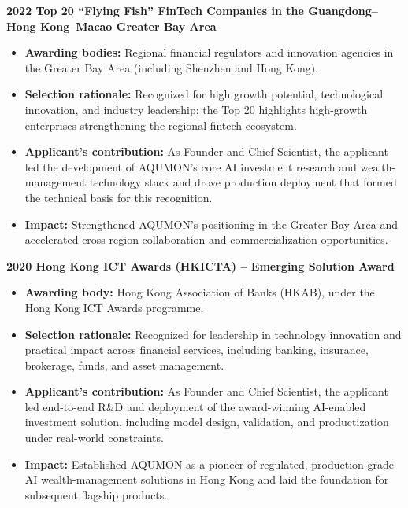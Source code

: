 \documentclass[11pt]{article}
\newenvironment{tightitemize}{%
  \begin{itemize}[leftmargin=*,nosep,topsep=2pt]
}{\end{itemize}}
\begin{document}
\vspace{0.6em}

\noindent\textbf{2022 \quad Top 20 ``Flying Fish'' FinTech Companies in the Guangdong--Hong Kong--Macao Greater Bay Area}\\
\begin{tightitemize}
  \item \textbf{Awarding bodies:} Regional financial regulators and innovation agencies in the Greater Bay Area (including Shenzhen and Hong Kong).
  \item \textbf{Selection rationale:} Recognized for high growth potential, technological innovation, and industry leadership; the Top 20 highlights high-growth enterprises strengthening the regional fintech ecosystem.
  \item \textbf{Applicant's contribution:} As Founder and Chief Scientist, the applicant led the development of AQUMON’s core AI investment research and wealth-management technology stack and drove production deployment that formed the technical basis for this recognition.
  \item \textbf{Impact:} Strengthened AQUMON’s positioning in the Greater Bay Area and accelerated cross-region collaboration and commercialization opportunities.
\end{tightitemize}

\vspace{0.6em}

\noindent\textbf{2020 \quad Hong Kong ICT Awards (HKICTA) -- Emerging Solution Award}\\
\begin{tightitemize}
  \item \textbf{Awarding body:} Hong Kong Association of Banks (HKAB), under the Hong Kong ICT Awards programme.
  \item \textbf{Selection rationale:} Recognized for leadership in technology innovation and practical impact across financial services, including banking, insurance, brokerage, funds, and asset management.
  \item \textbf{Applicant's contribution:} As Founder and Chief Scientist, the applicant led end-to-end R\&D and deployment of the award-winning AI-enabled investment solution, including model design, validation, and productization under real-world constraints.
  \item \textbf{Impact:} Established AQUMON as a pioneer of regulated, production-grade AI wealth-management solutions in Hong Kong and laid the foundation for subsequent flagship products.
\end{tightitemize}
\end{document}
